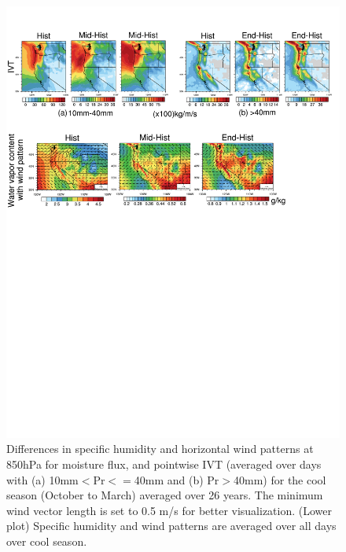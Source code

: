 \documentclass{ametsoc}
\begin{document}
\begin{figure}
\begin{center}
\includegraphics[width=6in]{discussion_indices.pdf}
\caption{Differences in specific humidity and horizontal wind patterns at 850hPa for moisture flux, and pointwise IVT (averaged over days with (a) 10mm$<$Pr$<=$40mm and (b) Pr$>$40mm) for the cool season (October to March) averaged over 26 years. The minimum wind vector length is set to 0.5 m/s for better visualization. (Lower plot) Specific humidity and wind patterns are averaged over all days over cool season.}
\label{fig:discussIndex}
\end{center}
\end{figure}
\end{document}
